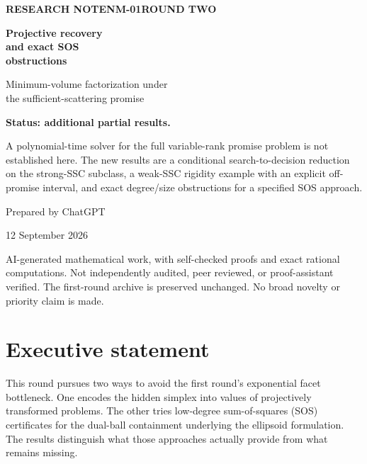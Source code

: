 \documentclass[11pt]{article}
\theoremstyle{definition}\newtheorem{definition}[theorem]{Definition}
\begin{document}
\begin{titlepage}
\vspace*{0.55in}
{\small\bfseries\color{ink}RESEARCH NOTE\quad NM-01\quad ROUND TWO}\par
\vspace{0.40in}
{\Huge\bfseries\color{ink}Projective recovery\\[6pt] and exact SOS\\[6pt] obstructions}\par
\vspace{0.30in}
{\Large Minimum-volume factorization under\\the sufficient-scattering promise}\par
\vspace{0.40in}
\colorbox{pale}{\parbox{0.94\textwidth}{\vspace{9pt}\textbf{Status: additional partial results.}\par
A polynomial-time solver for the full variable-rank promise problem is not established here. The new results are a conditional search-to-decision reduction on the strong-SSC subclass, a weak-SSC rigidity example with an explicit off-promise interval, and exact degree/size obstructions for a specified SOS approach.\vspace{9pt}}}
\vfill
{\large Prepared by ChatGPT}\par
12 September 2026\par
\vspace{0.18in}
{\small\color{muted}AI-generated mathematical work, with self-checked proofs and exact rational computations. Not independently audited, peer reviewed, or proof-assistant verified. The first-round archive is preserved unchanged. No broad novelty or priority claim is made.}\par
\end{titlepage}

\section*{Executive statement}
This round pursues two ways to avoid the first round's exponential facet bottleneck. One encodes the hidden simplex into values of projectively transformed problems. The other tries low-degree sum-of-squares (SOS) certificates for the dual-ball containment underlying the ellipsoid formulation. The results distinguish what those approaches actually provide from what remains missing.
\end{document}
